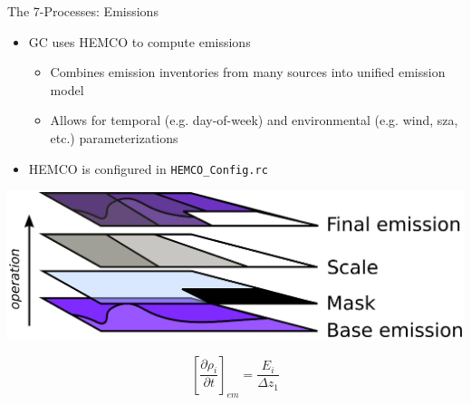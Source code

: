 \documentclass[10pt]{beamer}
\begin{document}
\begin{frame}[fragile]{The 7-Processes: Emissions}
    \begin{itemize}
        \item GC uses HEMCO to compute emissions
        \begin{itemize}
            \item Combines emission inventories from many sources into unified emission model
            \item Allows for temporal (e.g. day-of-week) and environmental (e.g. wind, sza, etc.) parameterizations
        \end{itemize}
        \item HEMCO is configured in \texttt{HEMCO\_Config.rc}
    \end{itemize}
    \begin{minipage}[c]{0.7\textwidth}
        \includegraphics[width=\textwidth]{hemco.eps}
    \end{minipage}
    \begin{minipage}[c]{0.29\textwidth}
        $$
            \left[ \frac{\partial \rho_i}{\partial t} \right]_{em} = \frac{E_i }{\Delta z_1}
        $$
    \end{minipage}
\end{frame}
\end{document}
